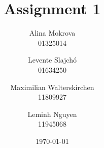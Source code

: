 \title{Assignment 1}
\author{Alina Mokrova\\
				01325014
				\and
				Levente	Slajchó\\
				01634250
				\and
				Maximilian Walterskirchen\\
				11809927
				\and
				Leminh Nguyen\\
				11945068}
\date{\today}
